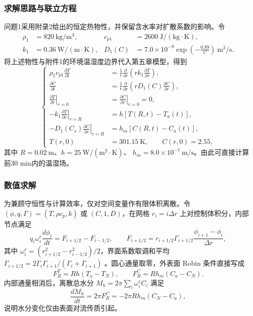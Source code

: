 \documentclass[12pt,a4paper]{ctexart}
\begin{document}
\subsubsection{求解思路与联立方程}
问题1采用附录2给出的恒定热物性，并保留含水率对扩散系数的影响。令
\begin{equation}
\begin{aligned}
\rho_1&=820\ \mathrm{kg/m^3},&
c_{p1}&=2600\ \mathrm{J/(kg\cdot K)},\\
k_1&=0.36\ \mathrm{W/(m\cdot K)},&
D_1(C)&=7.0\times10^{-9}\exp\!\left(-\frac{0.89}{C}\right)\ \mathrm{m^2/s}.
\end{aligned}
\end{equation}
将上述物性与附件1的环境温湿度边界代入第五章模型，得到
\begin{equation}
\left\{
\begin{aligned}
\rho_1c_{p1}\frac{\partial T}{\partial t}
&=\frac{1}{r}\frac{\partial}{\partial r}\!\left(rk_1\frac{\partial T}{\partial r}\right),\\
\frac{\partial C}{\partial t}
&=\frac{1}{r}\frac{\partial}{\partial r}\!\left(rD_1(C)\frac{\partial C}{\partial r}\right),\\
\left.\frac{\partial T}{\partial r}\right|_{r=0}
&=\left.\frac{\partial C}{\partial r}\right|_{r=0}=0,\\
-k_1\left.\frac{\partial T}{\partial r}\right|_{r=R}
&=h[T(R,t)-T_a(t)],\\
-D_1(C_s)\left.\frac{\partial C}{\partial r}\right|_{r=R}
&=h_m[C(R,t)-C_a(t)],\\
T(r,0)&=301.15\ \mathrm{K},\qquad C(r,0)=2.55,
\end{aligned}
\right.\label{eq:q1_system}
\end{equation}
其中 $R=0.02\ \mathrm{m}$、$h=25\ \mathrm{W/(m^2\cdot K)}$、
$h_m=8.0\times10^{-7}\ \mathrm{m/s}$。由此可直接计算前30 min内的温湿场。

\subsubsection{数值求解}
为兼顾守恒性与计算效率，仅对空间变量作有限体积离散。令
$(\phi,q,\Gamma)=(T,\rho c_p,k)$ 或 $(C,1,D)$，在网格
$r_i=i\Delta r$ 上对控制体积分，内部节点满足
\begin{equation}
q_i\omega_i^r\frac{d\phi_i}{dt}=F_{i+1/2}-F_{i-1/2},\qquad
F_{i+1/2}=r_{i+1/2}\Gamma_{i+1/2}
\frac{\phi_{i+1}-\phi_i}{\Delta r},\label{eq:fvm-r}
\end{equation}
其中 $\omega_i^r=(r_{i+1/2}^2-r_{i-1/2}^2)/2$，界面系数取调和平均
$\Gamma_{i+1/2}=2\Gamma_i\Gamma_{i+1}/(\Gamma_i+\Gamma_{i+1})$
\cite{patankar}。圆心通量取零，外表面 Robin 条件直接写成
\begin{equation}
F_R^T=Rh(T_a-T_N),\qquad F_R^C=Rh_m(C_a-C_N).
\end{equation}
内部通量相消后，离散总水分 $M_h=2\pi\sum_i\omega_i^rC_i$ 满足
\begin{equation}
\frac{dM_h}{dt}=2\pi F_R^C=-2\pi Rh_m(C_N-C_a),
\label{eq:global_conservation}
\end{equation}
说明水分变化仅由表面对流传质引起。
\end{document}
